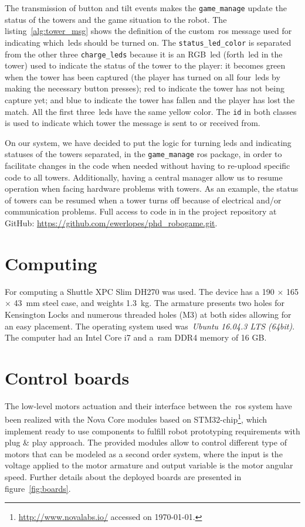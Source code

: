The transmission of button and tilt events makes the \verb|game_manage| update the status of the towers and the game situation to the robot. The listing~\ref{alg:tower_msg} shows the definition of the custom~\gls{ros} message used for indicating which~\glspl{led} should be turned on. The \verb|status_led_color| is separated from the other three \verb|charge_leds| because it is an RGB~\gls{led} (forth~\gls{led} in the tower) used to indicate the status of the tower to the player: it becomes green when the tower has been captured (the player has turned on all four~\glspl{led} by making the necessary button presses); red to indicate the tower has not being capture yet; and blue to indicate the tower has fallen and the player has lost the match. All the first three~\glspl{led} have the same yellow color. The \verb|id| in both classes is used to indicate which tower the message is sent to or received from.

On our system, we have decided to put the logic for turning leds and indicating statuses of the towers separated, \ie in the \verb|game_manage| \gls{ros} package, in order to facilitate changes in the code when needed without having to re-upload specific code to all towers. Additionally, having a central manager allow us to resume operation when facing hardware problems with towers. As an example, the status of towers can be resumed when a tower turns off because of electrical and/or communication problems. Full access to code in in the project repository at GitHub: \url{https://github.com/ewerlopes/phd_robogame.git}.

\section{Computing}
For computing a Shuttle XPC Slim DH270 was used. The device has a 190 $\times$ 165 $\times$ 43~mm steel case, and weights 1.3~kg.  The armature presents two holes for Kensington Locks and numerous threaded holes (M3) at both sides allowing for an easy placement. The operating system used was~\textit{Ubuntu 16.04.3 LTS (64bit)}. The computer had an Intel Core i7 and a~\gls{ram} DDR4 memory of 16 GB.

\section{Control boards}\label{novacore}
The low-level motors actuation and their interface between the~\gls{ros} system have been realized with the Nova Core modules based on STM32-chip\footnote{\url{http://www.novalabs.io/} accessed on \today.}, which implement ready to use components to fulfill robot prototyping requirements with plug \& play approach.  
The provided modules allow to control different type of motors that can be modeled as a second order system, where the input is the voltage applied to the motor armature and output variable is the motor angular speed. Further details about the deployed boards are presented in figure~\ref{fig:boards}.

